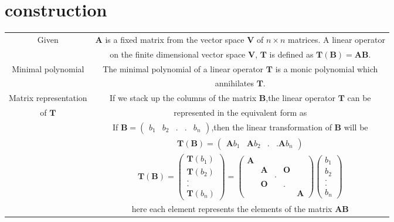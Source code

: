 \documentclass[journal,12pt,twocolumn]{IEEEtran}
\providecommand{\brak}[1]{\ensuremath{\left(#1\right)}}
\newcommand{\myvec}[1]{\ensuremath{\begin{pmatrix}#1\end{pmatrix}}}
\numberwithin{equation}{subsection}
\let\vec\mathbf
\newcommand\myemptypage{
	\null
	\thispagestyle{empty}
	\addtocounter{page}{-1}
	\newpage
}
\begin{document}
\section{construction}
\begin{table}[h]
    \centering
    \begin{tabular}{|c|c|}
    \hline
        Given &  $\vec{A}$ is a fixed matrix from the vector space $\vec{V}$ of $n\times n$ matrices. A linear operator \\
        &on the finite dimensional vector space $\vec{V}$, $\vec{T}$ is defined as $\vec{T\brak{B}}=\vec{AB}$.\\
    \hline
        Minimal polynomial & The minimal polynomial of a linear operator $\vec{T}$ is a monic polynomial which \\
        &annihilates $\vec{T}$.\\
    \hline
        Matrix representation & If we stack up the columns of the matrix $\vec{B}$,the linear operator $\vec{T}$ can be \\
        of $\vec{T}$ & represented in the equivalent form as \\
        & If $\vec{B}=\myvec{b_1&b_2&.&.&b_n}$,then the linear transformation of $\vec{B}$ will be\\
        &$\vec{T\brak{B}}=\myvec{\vec{A}b_1&\vec{A}b_2&.&.\vec{A}b_n}$\\
        & $\vec{T\brak{B}}=\myvec{\vec{T}\brak{b_1}\\\vec{T}\brak{b_2}\\.\\.\\\vec{T}\brak{b_n}}=\myvec{\vec{A}&&&&\\&\vec{A}&&\vec{O}&\\&&.&&\\&\vec{O}&&.&\\&&&&\vec{A}}\myvec{b_1\\b_2\\.\\.\\b_n}$\\
         & here each element represents the elements of the matrix $\vec{AB}$\\
    \hline
    \end{tabular}
\end{table}
\pagebreak
\myemptypage
\end{document}
